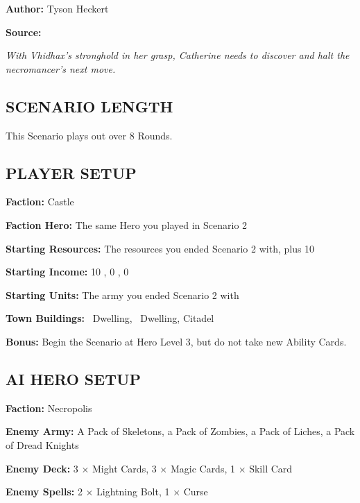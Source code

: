 
\begin{multicols*}{2}

\textbf{Author:} Tyson Heckert

\textbf{Source:} 

\textit{With Vhidhax's stronghold in her grasp, Catherine needs to discover and halt the necromancer's next move.}

\subsection*{\MakeUppercase{Scenario length}}

This Scenario plays out over 8 Rounds.

\subsection*{\MakeUppercase{Player setup}}

\textbf{Faction:} Castle

\textbf{Faction Hero:} The same Hero you played in Scenario 2

\textbf{Starting Resources:} The resources you ended Scenario 2 with, plus 10 

\textbf{Starting Income:} 10 , 0 , 0 

\textbf{Starting Units:} The army you ended Scenario 2 with

\textbf{Town Buildings:} \bronze\ Dwelling, \silver\ Dwelling, Citadel

\textbf{Bonus:} Begin the Scenario at Hero Level 3, but do not take new Ability Cards.

\subsection*{\MakeUppercase{AI Hero setup}}

\textbf{Faction:} Necropolis

\textbf{Enemy Army:} A Pack of Skeletons, a Pack of Zombies, a Pack of Liches, a Pack of Dread Knights

\textbf{Enemy Deck:} 3 × Might Cards, 3 × Magic Cards, 1 × Skill Card

\textbf{Enemy Spells:} 2 × Lightning Bolt, 1 × Curse


\end{multicols*}

